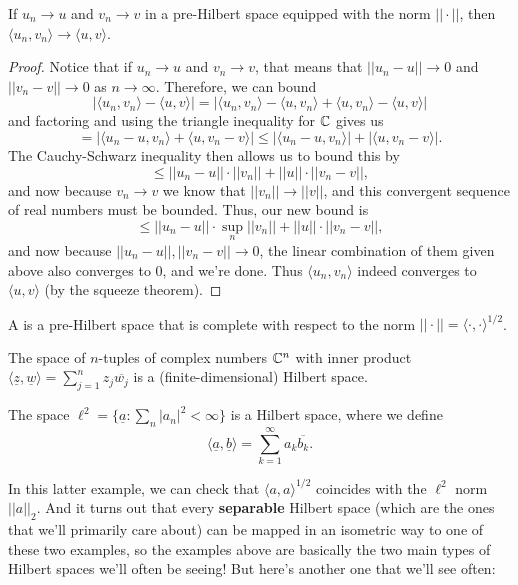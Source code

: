 \begin{theorem}
If $u_n \to u$ and $v_n \to v$ in a pre-Hilbert space equipped with the norm $||\cdot||$, then $\langle u_n, v_n \rangle \to \langle u, v \rangle$.
\end{theorem}
\begin{proof}
Notice that if $u_n \to u$ and $v_n \to v$, that means that $||u_n - u|| \to 0$ and $||v_n - v|| \to 0$ as $n \to \infty$. Therefore, we can bound
\[
    |\langle u_n, v_n \rangle - \langle u, v \rangle| = |\langle u_n, v_n \rangle - \langle u, v_n \rangle + \langle u, v_n \rangle - \langle u, v \rangle|
\]
and factoring and using the triangle inequality for $\mathbb C$ gives us 
\[
    = |\langle u_n - u, v_n \rangle + \langle u, v_n - v \rangle| \le  |\langle u_n - u, v_n \rangle| + |\langle u, v_n - v \rangle|.
\]
The Cauchy-Schwarz inequality then allows us to bound this by 
\[
    \le ||u_n - u|| \cdot ||v_n|| + ||u|| \cdot ||v_n - v||,
\]
and now because $v_n \to v$ we know that $||v_n|| \to ||v||$, and this convergent sequence of real numbers must be bounded. Thus, our new bound is 
\[
    \le ||u_n - u|| \cdot \sup_n||v_n|| + ||u|| \cdot ||v_n - v||,
\]
and now because $||u_n - u||, ||v_n - v|| \to 0$, the linear combination of them given above also converges to $0$, and we're done. Thus $\langle u_n, v_n \rangle$ indeed converges to $\langle u, v \rangle$ (by the squeeze theorem).
\end{proof}

\begin{definition}
A  is a pre-Hilbert space that is complete with respect to the norm $||\cdot|| = \langle \cdot, \cdot \rangle^{1/2}$.
\end{definition}

\begin{example}
The space of $n$-tuples of complex numbers $\mathbb C^n$ with inner product $\langle \underline{z}, \underline{w} \rangle = \sum_{j=1}^n z_j \overline{w_j}$ is a (finite-dimensional) Hilbert space.
\end{example}

\begin{example}
The space $\ell^2 = \{\underline{a}: \sum_{n} |a_n|^2 < \infty\}$ is a Hilbert space, where we define 
\[
    \langle \underline{a}, \underline{b} \rangle = \sum_{k=1}^{\infty} a_k \overline{b_k}.
\]
\end{example}

In this latter example, we can check that $\langle a, a \rangle^{1/2}$ coincides with the $\ell^2$ norm $||a||_2$. And it turns out that every \textbf{separable} Hilbert space (which are the ones that we'll primarily care about) can be mapped in an isometric way to one of these two examples, so the examples above are basically the two main types of Hilbert spaces we'll often be seeing! But here's another one that we'll see often:

